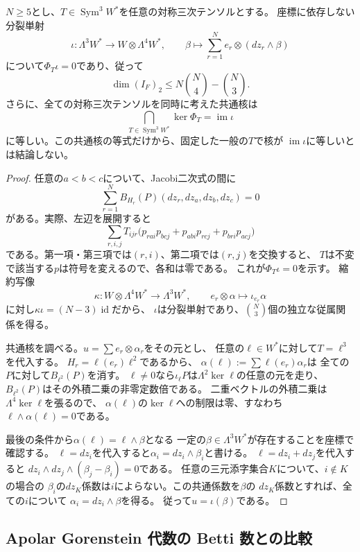 \begin{lemma}
\label{lem:nfold-universal-row-relations}
$N\ge5$とし、$T\in\operatorname{Sym}^3W^*$を任意の対称三次テンソルとする。
座標に依存しない分裂単射
\[
 \iota:\Lambda^3W^*\longrightarrow W\otimes\Lambda^4W^*,
 \qquad\beta\longmapsto\sum_{r=1}^N e_r\otimes(dz_r\wedge\beta)
\]
について$\Phi_T\iota=0$であり、従って
\[
 \dim(I_F)_2\le N\binom N4-\binom N3.
\]
さらに、全ての対称三次テンソルを同時に考えた共通核は
\[
 \bigcap_{T\in\operatorname{Sym}^3W^*}\ker\Phi_T=\operatorname{im}\iota
\]
に等しい。この共通核の等式だけから、固定した一般の$T$で核が
$\operatorname{im}\iota$に等しいとは結論しない。
\end{lemma}
\begin{proof}
任意の$a<b<c$について、Jacobi二次式の間に
\[
 \sum_{r=1}^N B_{H_r}(P)(dz_r,dz_a,dz_b,dz_c)=0
\]
がある。実際、左辺を展開すると
\[
 \sum_{r,i,j}T_{ijr}
 \bigl(p_{rai}p_{bcj}+p_{abi}p_{rcj}+p_{bri}p_{acj}\bigr)
\]
である。第一項・第三項では$(r,i)$、第二項では$(r,j)$を交換すると、
$T$は不変で該当する$p$は符号を変えるので、各和は零である。
これが$\Phi_T\iota=0$を示す。
縮約写像
\[
 \kappa:W\otimes\Lambda^4W^*\longrightarrow\Lambda^3W^*,
 \qquad e_r\otimes\alpha\longmapsto\iota_{e_r}\alpha
\]
に対し$\kappa\iota=(N-3)\operatorname{id}$だから、
$\iota$は分裂単射であり、$\binom N3$個の独立な従属関係を得る。

共通核を調べる。$u=\sum e_r\otimes\alpha_r$をその元とし、
任意の$\ell\in W^*$に対して$T=\ell^3$を代入する。
$H_r=\ell(e_r)\ell^2$であるから、
$\alpha(\ell):=\sum\ell(e_r)\alpha_r$は
全ての$P$に対して$B_{\ell^2}(P)$を消す。
$\ell\ne0$なら$\iota_\ell P$は$\Lambda^2\ker\ell$の任意の元を走り、
$B_{\ell^2}(P)$はその外積二乗の非零定数倍である。
二重ベクトルの外積二乗は$\Lambda^4\ker\ell$を張るので、
$\alpha(\ell)$の$\ker\ell$への制限は零、すなわち
$\ell\wedge\alpha(\ell)=0$である。

最後の条件から$\alpha(\ell)=\ell\wedge\beta$となる
一定の$\beta\in\Lambda^3W^*$が存在することを座標で確認する。
$\ell=dz_i$を代入すると$\alpha_i=dz_i\wedge\beta_i$と書ける。
$\ell=dz_i+dz_j$を代入すると
$dz_i\wedge dz_j\wedge(\beta_j-\beta_i)=0$である。
任意の三元添字集合$K$について、$i\notin K$の場合の
$\beta_i$の$dz_K$係数は$i$によらない。この共通係数を$\beta$の
$dz_K$係数とすれば、全ての$i$について
$\alpha_i=dz_i\wedge\beta$を得る。
従って$u=\iota(\beta)$である。
\end{proof}


\subsection{Apolar Gorenstein 代数の Betti 数との比較}

